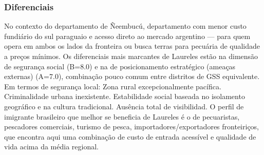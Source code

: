 \subsubsection*{Diferenciais}\label{dif-laureles-1209}
No contexto do departamento de Ñeembucú, departamento com menor custo fundiário do sul paraguaio e acesso direto ao mercado argentino — para quem opera em ambos os lados da fronteira ou busca terras para pecuária de qualidade a preços mínimos. Os diferenciais mais marcantes de Laureles estão na dimensão de segurança social (B=8.0) e na de posicionamento estratégico (ameaças externas) (A=7.0), combinação pouco comum entre distritos de GSS equivalente. Em termos de segurança local: Zona rural excepcionalmente pacífica. Criminalidade urbana inexistente. Estabilidade social baseada no isolamento geográfico e na cultura tradicional. Ausência total de visibilidad. O perfil de imigrante brasileiro que melhor se beneficia de Laureles é o de pecuaristas, pescadores comerciais, turismo de pesca, importadores/exportadores fronteiriços, que encontra aqui uma combinação de custo de entrada acessível e qualidade de vida acima da média regional.
